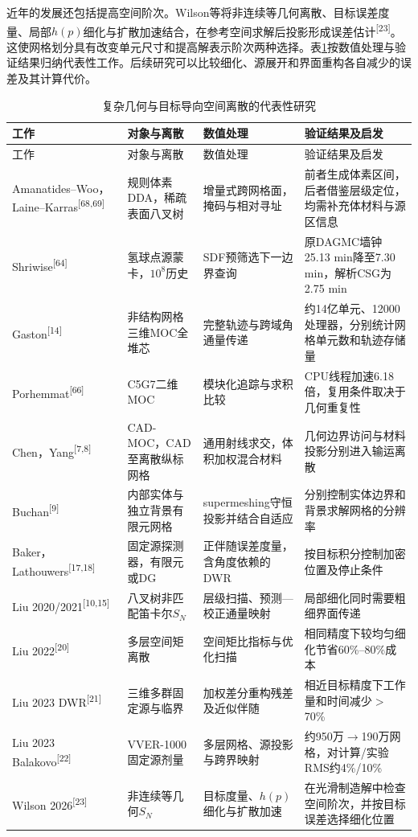 \documentclass[UTF8, zihao=-4, fontset=none, a4paper]{ctexart}
\newcommand{\upcite}[1]{\textsuperscript{[#1]}}
\begin{document}
近年的发展还包括提高空间阶次。Wilson等将非连续等几何离散、目标误差度量、局部\(h(p)\)细化与扩散加速结合，在参考空间求解后投影形成误差估计\upcite{23}。这使网格划分具有改变单元尺寸和提高解表示阶次两种选择。表\ref{tab:1}按数值处理与验证结果归纳代表性工作。后续研究可以比较细化、源展开和界面重构各自减少的误差及其计算代价。 \begin{longtable}{@{}>{\raggedright\arraybackslash}p{}>{\raggedright\arraybackslash}p{}>{\raggedright\arraybackslash}p{}>{\raggedright\arraybackslash}p{}@{}}
\caption{复杂几何与目标导向空间离散的代表性研究}\label{tab:1}\\
\toprule
工作 & 对象与离散 & 数值处理 & 验证结果及启发 \\
\midrule
\endfirsthead
\toprule
工作 & 对象与离散 & 数值处理 & 验证结果及启发 \\
\midrule
\endhead
\bottomrule
\endlastfoot
Amanatides--Woo，Laine--Karras\upcite{68,69} & 规则体素DDA，稀疏表面八叉树 & 增量式跨网格面，掩码与相对寻址 & 前者生成体素区间，后者借鉴层级定位，均需补充体材料与源区信息 \\
Shriwise\upcite{64} & 氢球点源蒙卡，$10^8$历史 & SDF预筛选下一边界查询 & 原DAGMC墙钟25.13 min降至7.30 min，解析CSG为2.75 min \\
Gaston\upcite{14} & 非结构网格三维MOC全堆芯 & 完整轨迹与跨域角通量传递 & 约14亿单元、12000处理器，分别统计网格单元数和轨迹存储量 \\
Porhemmat\upcite{66} & C5G7二维MOC & 模块化追踪与求积比较 & 16 CPU线程加速6.18倍，复用条件取决于几何重复性 \\
Chen，Yang\upcite{7,8} & CAD-MOC，CAD至离散纵标网格 & 通用射线求交，体积加权混合材料 & 几何边界访问与材料投影分别进入输运离散 \\
Buchan\upcite{9} & 内部实体与独立背景有限元网格 & supermeshing守恒投影并结合自适应 & 分别控制实体边界和背景求解网格的分辨率 \\
Baker，Lathouwers\upcite{17,18} & 固定源探测器，有限元或DG & 正伴随误差度量，含角度依赖的DWR & 按目标积分控制加密位置及停止条件 \\
Liu 2020/2021\upcite{10,15} & 八叉树非匹配笛卡尔$S_N$ & 层级扫描、预测—校正通量映射 & 局部细化同时需要粗细界面传递 \\
Liu 2022\upcite{20} & 多层空间矩离散 & 空间矩比指标与优化扫描 & 相同精度下较均匀细化节省60\%--80\%成本 \\
Liu 2023 DWR\upcite{21} & 三维多群固定源与临界 & 加权差分重构残差及近似伴随 & 相近目标精度下工作量和时间减少$>$70\% \\
Liu 2023 Balakovo\upcite{22} & VVER-1000固定源剂量 & 多层网格、源投影与跨界映射 & 约950万$\rightarrow$190万网格，对计算/实验RMS约4\%/10\% \\
Wilson 2026\upcite{23} & 非连续等几何$S_N$ & 目标度量、$h(p)$细化与扩散加速 & 在光滑制造解中检查空间阶次，并按目标误差选择细化位置 \\
\end{longtable}
\end{document}
